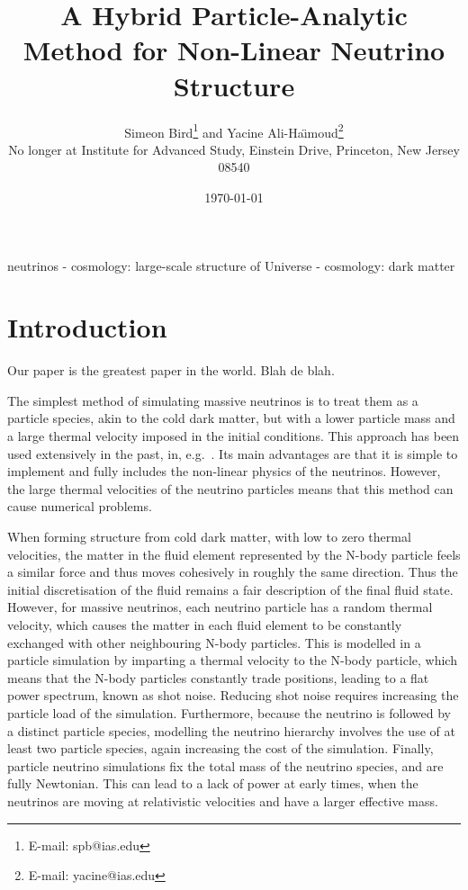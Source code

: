 \documentclass[useAMS, usenatbib]{mnras}
\title{A Hybrid Particle-Analytic Method for Non-Linear Neutrino Structure}
\author[ S. Bird and Y. Ali-Ha\"{\i}moud]{
  Simeon Bird\thanks{E-mail: spb@ias.edu} and Yacine Ali-Ha\"{\i}moud\thanks{E-mail: yacine@ias.edu}\vspace{1.5mm}\\
No longer at Institute for Advanced Study, Einstein Drive, Princeton, New Jersey 08540}
\begin{document}
\date{\today}

\pagerange{\pageref{firstpage}--\pageref{lastpage}} 
\label{firstpage}

\maketitle

\begin{abstract}
\end{abstract}

\begin{keywords}
        neutrinos - cosmology: large-scale structure of Universe - cosmology: dark matter
\end{keywords}

\section{Introduction}

Our paper is the greatest paper in the world. Blah de blah. \cite{AHB}

The simplest method of simulating massive neutrinos is to treat them as a particle species, akin
to the cold dark matter, but with a lower particle mass and a large thermal velocity imposed
in the initial conditions. This approach has been used extensively in the past,
in, e.g.~\citep{Brandbyge_2008, Bird_2012}. Its main advantages are that it is simple to implement and fully includes the non-linear physics of the neutrinos. However, the large thermal velocities of the neutrino particles means that this method can cause numerical problems.

When forming structure from cold dark matter, with low to zero thermal velocities, the matter in the fluid element represented by the N-body particle feels a similar force and thus moves cohesively in roughly the same direction. Thus
the initial discretisation of the fluid remains a fair description of the final fluid state. However, for massive neutrinos, each neutrino particle has a random thermal velocity, which causes the matter in each fluid element to be constantly exchanged with other neighbouring N-body particles. This is modelled in a particle simulation by imparting a thermal velocity to the N-body particle, which means that the N-body particles constantly trade positions, leading to a flat power spectrum, known as shot noise. Reducing shot noise requires increasing the particle load of the simulation.
Furthermore, because the neutrino is followed by a distinct particle species, modelling the neutrino hierarchy involves the use of at least two particle species, again increasing the cost of the simulation. Finally, particle neutrino simulations fix the total mass of the neutrino species, and are fully Newtonian. This can lead to a lack of power at early times, when the neutrinos are moving at relativistic velocities and have a larger effective mass.
\end{document}
